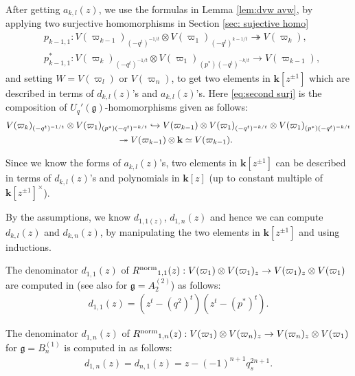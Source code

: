 \documentclass[11pt, leqno]{amsart}
\theoremstyle{definition}
\numberwithin{equation}{section}
\begin{document}
After getting $a_{k,l}(z)$, we use the formulas in Lemma \ref{lem:dvw avw},
by applying two surjective homomorphisms in Section \ref{sec: sujective homo}
\begin{align}
&   p_{k-1,1} \colon V(\varpi_{k-1})_{(-q^t)^{-1/t}} \otimes V(\varpi_{1})_{(-q^t)^{k-1/t}}   \twoheadrightarrow V(\varpi_{k}), \label{eq:first surj} \\
&   p^*_{k-1,1} \colon V(\varpi_k)_{(-q^t)^{-1/t}} \otimes V(\varpi_1)_{(p^*)(-q^t)^{-k/t}} \rightarrow V(\varpi_{k-1}), \label{eq:second surj}
\end{align}
and setting $W=V({\varpi}_l)$ or $V({\varpi}_n)$, to get two elements in ${\mathbf{k}}[z^{\pm 1}]$ which are described in terms of $d_{k,l}(z)$'s and $a_{k,l}(z)$'s.
Here \eqref{eq:second surj} is the composition of $U_q'({\mathfrak g})$-homomorphisms given as follows:
\begin{align*}
V(\varpi_k)_{(-q^t)^{-1/t}} \otimes V(\varpi_1)_{(p^*)(-q^t)^{-k/t}} & \hookrightarrow
V(\varpi_{k-1}) \otimes V({\varpi}_1)_{(-q^t)^{-k/t}} \otimes  V(\varpi_1)_{(p^*)(-q^t)^{-k/t}} \\
& \hspace{-8ex} \twoheadrightarrow V(\varpi_{k-1}) \otimes {\mathbf{k}} \simeq V(\varpi_{k-1}).
\end{align*}

Since we know the forms of $a_{k,l}(z)$'s, two elements in ${\mathbf{k}}[z^{\pm 1}]$ can be described in terms of
$d_{k,l}(z)$'s and polynomials in ${\mathbf{k}}[z]$ (up to constant multiple of ${\mathbf{k}}[z^{\pm 1}]^\times$).

By the assumptions, we know $d_{1,1(z)}$, $d_{1,n}(z)$ and hence we can
compute $d_{k,l}(z)$ and $d_{k,n}(z)$, by manipulating the two elements in ${\mathbf{k}}[z^{\pm 1}]$ and using inductions.

\bigskip

The denominator $d_{1,1}(z)$ of ${R^{\rm{norm}}}_{1,1}(z): V({\varpi}_1) \otimes V({\varpi}_1)_z \to V({\varpi}_1)_z \otimes V({\varpi}_1)$ are computed in \cite{KMN2}
(see also \cite{HYZ} for ${\mathfrak g}=A^{(2)}_{2}$) as follows:
\begin{align} \label{eq: denominator d11}
  d_{1,1}(z)=(z^t-(q^2)^t)(z^t-(p^*)^t).
\end{align}

The denominator $d_{1,n}(z)$ of ${R^{\rm{norm}}}_{1,n}(z): V({\varpi}_1) \otimes V({\varpi}_n)_z \to V({\varpi}_n)_z \otimes V({\varpi}_1)$ for ${\mathfrak g}=B^{(1)}_{n}$
is computed in \cite{DO96} as follows:
\begin{align}\label{eq:deno1n B}
d_{1,n}(z)=d_{n,1}(z)= z-(-1)^{n+1}q_s^{2n+1}.
\end{align}
\end{document}

